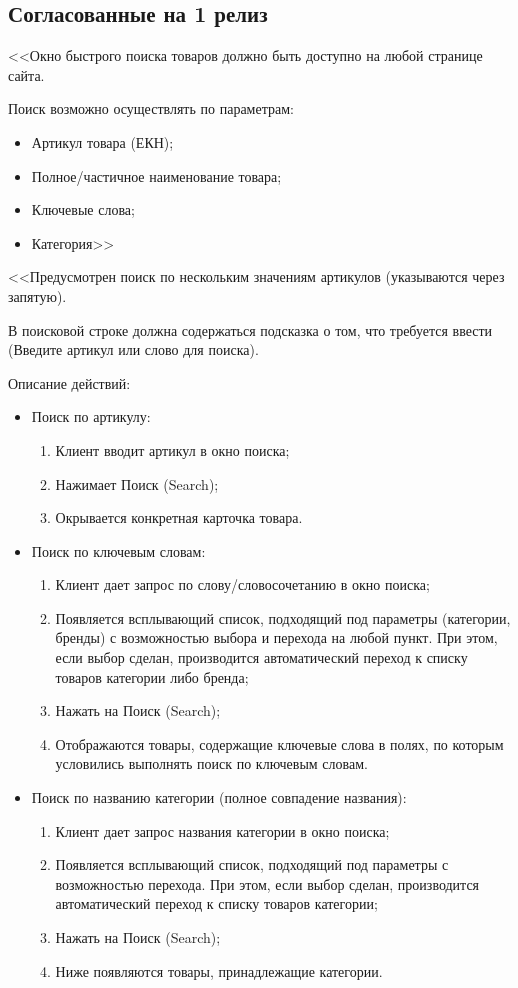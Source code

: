 \subsection{Согласованные на 1 релиз}
\fi
{}
{
<<Окно быстрого поиска товаров должно быть доступно на любой странице сайта.

Поиск возможно осуществлять по параметрам:
\begin{itemize}
	\item Артикул товара (ЕКН);
	\item Полное/частичное наименование товара;
	\item Ключевые слова;
	\item Категория>>
\end{itemize}

<<Предусмотрен поиск по нескольким значениям артикулов (указываются через запятую).

В поисковой строке должна содержаться подсказка о том, что требуется ввести (Введите артикул или слово для поиска).

Описание действий:
\begin{itemize}

\item Поиск по артикулу:
	\begin{enumerate} 
		\item Клиент вводит артикул в окно поиска;
		\item Нажимает Поиск (Search);
		\item Окрывается конкретная карточка товара.
	\end{enumerate}	
	
\item Поиск по ключевым словам:
 	\begin{enumerate} 
	 	\item Клиент дает запрос по слову/словосочетанию в окно поиска;
		\item Появляется всплывающий список, подходящий под параметры (категории, бренды) с возможностью выбора и перехода на любой пункт. При этом, если выбор сделан, производится автоматический переход к списку товаров категории либо бренда;
		\item Нажать на Поиск (Search);
		\item Отображаются товары, содержащие ключевые слова в полях, по которым условились выполнять поиск по ключевым словам.
	\end{enumerate}
	
\item Поиск по названию категории (полное совпадение названия):
 	\begin{enumerate} 
 		\item Клиент дает запрос названия категории в окно поиска;
		\item	Появляется всплывающий список, подходящий под параметры с возможностью перехода. При этом, если выбор сделан, производится автоматический переход к списку товаров категории;
		\item	Нажать на Поиск (Search);
		\item	Ниже появляются товары, принадлежащие категории.
	\end{enumerate}	
		

\end{itemize}}
